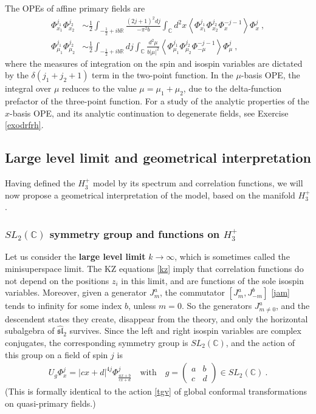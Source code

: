 \documentclass[12pt, a4paper, notitlepage, twoside]{report}
\numberwithin{equation}{section}
\theoremstyle{break}
\begin{document}
The OPEs of affine primary fields are
\begin{align}
 \Phi^{j_1}_{x_1}\Phi^{j_2}_{x_2} &\sim \frac12 \int_{-\frac12 + ib\mathbb{R}} \frac{(2j+1)^2 dj}{-\pi^2b}\int_{{\mathbb{C}}}d^2x \left\langle \Phi^{j_1}_{x_1}\Phi^{j_2}_{x_2} \Phi^{-j-1}_{x} \right\rangle \Phi^j_{x}\ ,
\label{xope}
\\
\Phi^{j_1}_{\mu_1}\Phi^{j_2}_{\mu_2} &\sim \frac12 \int_{-\frac12 + ib\mathbb{R}} dj\int_{{\mathbb{C}}}\frac{d^2\mu}{b|\mu|^2} \left\langle \Phi^{j_1}_{\mu_1}\Phi^{j_2}_{\mu_2} \Phi^{-j-1}_{-\mu} \right\rangle \Phi^j_{\mu}\ , 
\label{mope}
\end{align}
where the measures of integration on the spin and isospin variables are dictated by the $\delta(j_1+j_2+1)$ term in the two-point function.
In the $\mu$-basis OPE, the integral over $\mu$ reduces to the value $\mu=\mu_1+\mu_2$, due to the delta-function prefactor of the three-point function. 
For a study of the analytic properties of the $x$-basis OPE, and its analytic continuation to degenerate fields, see Exercise \ref{exodrfrh}.

\subsection{Large level limit and geometrical interpretation}

Having defined the $H_3^+$ model by its spectrum and correlation functions, we will now propose a geometrical interpretation of the model, based on the manifold $H_3^+$.

\subsubsection{$SL_2({\mathbb{C}})$ symmetry group and functions on $H_3^+$}

Let us consider the \textbf{\boldmath large level limit} $k\to \infty$, which is sometimes called the minisuperspace limit. 
The KZ equations \eqref{kz} imply that correlation functions do not depend on the positions $z_i$ in this limit, and are functions of the sole isospin variables. 
Moreover, given a generator $J^a_m$, the commutator $[J^a_m,J^b_{-m}]$ \eqref{jam}  tends to infinity for some index $b$, unless $m=0$. 
So the generators $J^a_{m\neq 0}$, and the descendent states they create, disappear from the theory, and only the horizontal subalgebra of $\widehat{\mathfrak{sl}}_2$ survives.
Since the left and right isospin variables are complex conjugates, the corresponding symmetry group is $SL_2({\mathbb{C}})$, and the action of this group on a field of spin $j$ is 
\begin{align}
 U_g\Phi^j_{x} = |cx+d|^{4j}\Phi^j_{\frac{ax+b}{cx+d}} \quad \text{with} \quad g = \left(\begin{array}{cc} a & b \\ c & d \end{array}\right) \in SL_2({\mathbb{C}})\ .
\label{ugp}
\end{align}
(This is formally identical to the action \eqref{tgv} of global conformal transformations on quasi-primary fields.)
\end{document}
